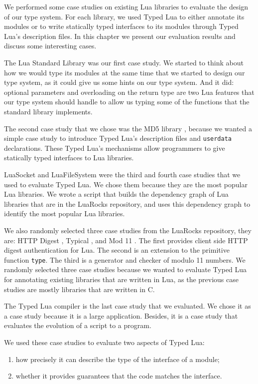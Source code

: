 
We performed some case studies on existing Lua libraries
to evaluate the design of our type system.
For each library, we used Typed Lua to either annotate its modules
or to write statically typed interfaces to its modules through
Typed Lua's description files.
In this chapter we present our evaluation results and discuss some
interesting cases.

The Lua Standard Library \citep{luamanual} was our first case study.
We started to think about how we would type its modules at the same time
that we started to design our type system, as it could give us some
hints on our type system.
And it did: optional parameters and overloading on the return type
are two Lua features that our type system should handle to allow us
typing some of the functions that the standard library implements.

The second case study that we chose was the MD5 library \citep{lmd5},
because we wanted a simple case study to introduce Typed Lua's description
files and \texttt{userdata} declarations.
These Typed Lua's mechanisms allow programmers to give statically typed
interfaces to Lua libraries.

LuaSocket \citep{luasocket} and LuaFileSystem \citep{luafilesystem} were
the third and fourth case studies that we used to evaluate Typed Lua.
We chose them because they are the most popular Lua libraries.
We wrote a script that builds the dependency graph of Lua libraries
that are in the LuaRocks repository, and uses this dependency graph
to identify the most popular Lua libraries.

We also randomly selected three case studies from the LuaRocks
repository, they are: HTTP Digest \citep{luahttpdigest},
Typical \citep{luatypical}, and Mod 11 \citep{luamod11}.
The first provides client side HTTP digest authentication for Lua.
The second is an extension to the primitive function \texttt{type}.
The third is a generator and checker of modulo 11 numbers.
We randomly selected three case studies because we wanted to evaluate
Typed Lua for annotating existing libraries that are written in Lua,
as the previous case studies are mostly libraries that are written in C.

The Typed Lua compiler is the last case study that we evaluated.
We chose it as a case study because it is a large application.
Besides, it is a case study that evaluates the evolution of a script
to a program.

We used these case studies to evaluate two aspects of Typed Lua:
\begin{enumerate}
\item how precisely it can describe the type of the interface of a module;
\item whether it provides guarantees that the code matches the interface.
\end{enumerate}


